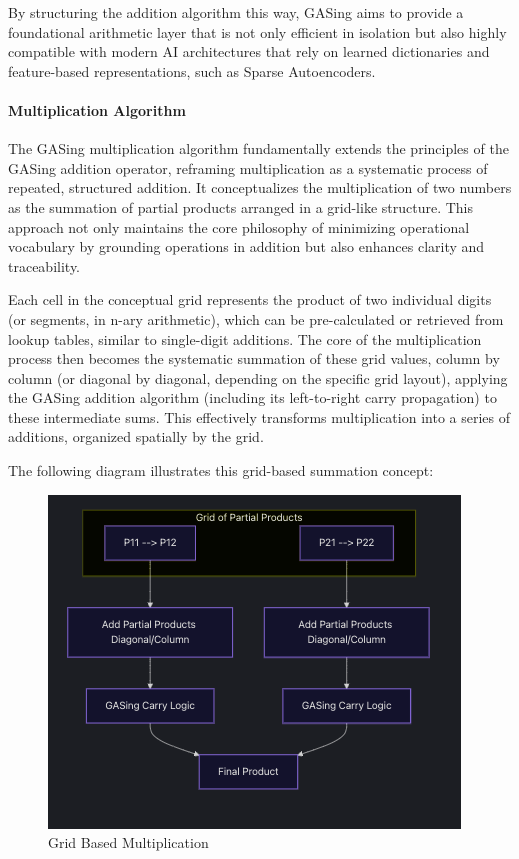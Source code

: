 By structuring the addition algorithm this way, GASing aims to provide a foundational arithmetic layer that is not only efficient in isolation but also highly compatible with modern AI architectures that rely on learned dictionaries and feature-based representations, such as Sparse Autoencoders.
\paragraph{Multiplication Algorithm}

The GASing multiplication algorithm fundamentally extends the principles of the GASing addition operator, reframing multiplication as a systematic process of repeated, structured addition. It conceptualizes the multiplication of two numbers as the summation of partial products arranged in a grid-like structure. This approach not only maintains the core philosophy of minimizing operational vocabulary by grounding operations in addition but also enhances clarity and traceability.

Each cell in the conceptual grid represents the product of two individual digits (or segments, in n-ary arithmetic), which can be pre-calculated or retrieved from lookup tables, similar to single-digit additions. The core of the multiplication process then becomes the systematic summation of these grid values, column by column (or diagonal by diagonal, depending on the specific grid layout), applying the GASing addition algorithm (including its left-to-right carry propagation) to these intermediate sums. This effectively transforms multiplication into a series of additions, organized spatially by the grid.

The following diagram illustrates this grid-based summation concept:


\begin{figure}[H]
  \centering
  \includegraphics[width=\linewidth]{images/GridBasedMultiplication.png}
  \caption{Grid Based Multiplication}
  \label{fig:gridbasedmultiplication}
\end{figure}


